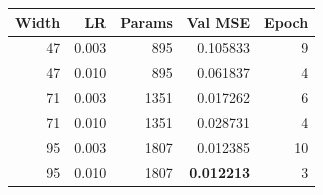 \begin{center}
\small
\setlength{\tabcolsep}{4pt}
\begin{tabular}{@{}rrrrr@{}}
\toprule
Width & LR & Params & Val MSE & Epoch\\
\midrule
47 & 0.003 & 895 & 0.105833 & 9\\
47 & 0.010 & 895 & 0.061837 & 4\\
71 & 0.003 & 1351 & 0.017262 & 6\\
71 & 0.010 & 1351 & 0.028731 & 4\\
95 & 0.003 & 1807 & 0.012385 & 10\\
95 & 0.010 & 1807 & \textbf{0.012213} & 3\\
\bottomrule
\end{tabular}
\end{center}